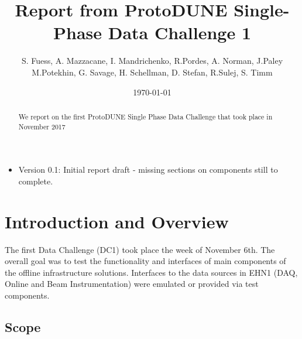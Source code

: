 \documentclass[pdftex,12pt,letter]{article}
\title{Report from ProtoDUNE Single-Phase Data Challenge 1}
\date{\today}
\author{S. Fuess, A. Mazzacane,  I. Mandrichenko, R.Pordes,  A. Norman, J.Paley \\
M.Potekhin, G. Savage, H. Schellman, D. Stefan, R.Sulej, S. Timm}
\begin{document}
\maketitle
\begin{abstract}
\noindent We report on the first ProtoDUNE Single Phase Data Challenge that took place in November 2017
\end{abstract}


\begin{itemize}
\item Version 0.1: Initial report draft - missing sections on components still to complete.
\clearpage
\end{itemize}

\tableofcontents
\pagebreak



\section{Introduction and Overview}

The first Data Challenge  (DC1) took place the week of November 6th. The overall goal was to test the functionality and interfaces of main components of the offline infrastructure solutions.  Interfaces to the data sources in EHN1 (DAQ, Online and Beam Instrumentation) were emulated or provided via test components. 
\subsection  {Scope}
\end{document}
